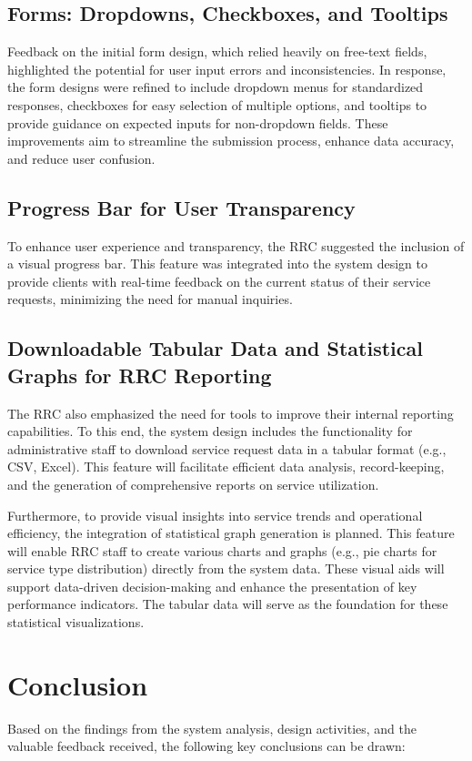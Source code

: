 \subsection{Forms: Dropdowns, Checkboxes, and Tooltips}
Feedback on the initial form design, which relied heavily on free-text fields, highlighted the potential for user input errors and inconsistencies. In response, the form designs were refined to include dropdown menus for standardized responses, checkboxes for easy selection of multiple options, and tooltips to provide guidance on expected inputs for non-dropdown fields. These improvements aim to streamline the submission process, enhance data accuracy, and reduce user confusion.

\subsection{Progress Bar for User Transparency}
To enhance user experience and transparency, the RRC suggested the inclusion of a visual progress bar. This feature was integrated into the system design to provide clients with real-time feedback on the current status of their service requests, minimizing the need for manual inquiries.

\subsection{Downloadable Tabular Data and Statistical Graphs for RRC Reporting}
The RRC also emphasized the need for tools to improve their internal reporting capabilities. To this end, the system design includes the functionality for administrative staff to download service request data in a tabular format (e.g., CSV, Excel). This feature will facilitate efficient data analysis, record-keeping, and the generation of comprehensive reports on service utilization.

Furthermore, to provide visual insights into service trends and operational efficiency, the integration of statistical graph generation is planned. This feature will enable RRC staff to create various charts and graphs (e.g., pie charts for service type distribution) directly from the system data. These visual aids will support data-driven decision-making and enhance the presentation of key performance indicators. The tabular data will serve as the foundation for these statistical visualizations.

\section{Conclusion}
Based on the findings from the system analysis, design activities, and the valuable feedback received, the following key conclusions can be drawn:

